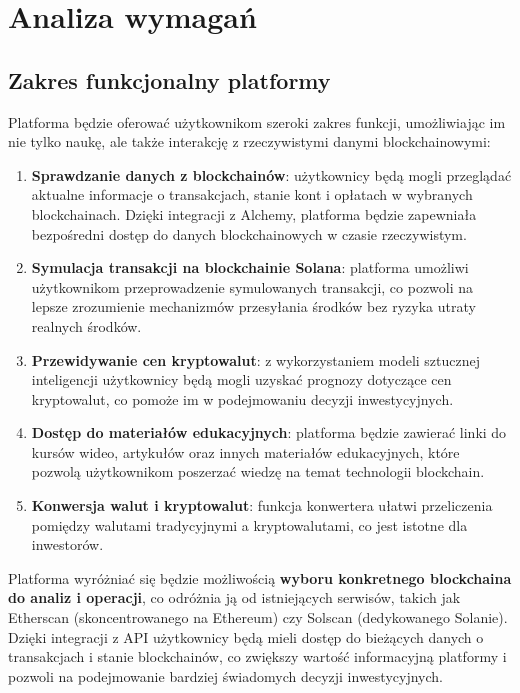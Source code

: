 \chapter{Analiza wymagań}

\section{Zakres funkcjonalny platformy}

Platforma będzie oferować użytkownikom szeroki zakres funkcji, umożliwiając im nie tylko naukę, ale także interakcję z rzeczywistymi danymi blockchainowymi:

\begin{enumerate} \item \textbf{Sprawdzanie danych z blockchainów}: użytkownicy będą mogli przeglądać aktualne informacje o transakcjach, stanie kont i opłatach w wybranych blockchainach. Dzięki integracji z Alchemy, platforma będzie zapewniała bezpośredni dostęp do danych blockchainowych w czasie rzeczywistym. \item \textbf{Symulacja transakcji na blockchainie Solana}: platforma umożliwi użytkownikom przeprowadzenie symulowanych transakcji, co pozwoli na lepsze zrozumienie mechanizmów przesyłania środków bez ryzyka utraty realnych środków. \item \textbf{Przewidywanie cen kryptowalut}: z wykorzystaniem modeli sztucznej inteligencji użytkownicy będą mogli uzyskać prognozy dotyczące cen kryptowalut, co pomoże im w podejmowaniu decyzji inwestycyjnych. \item \textbf{Dostęp do materiałów edukacyjnych}: platforma będzie zawierać linki do kursów wideo, artykułów oraz innych materiałów edukacyjnych, które pozwolą użytkownikom poszerzać wiedzę na temat technologii blockchain. \item \textbf{Konwersja walut i kryptowalut}: funkcja konwertera ułatwi przeliczenia pomiędzy walutami tradycyjnymi a kryptowalutami, co jest istotne dla inwestorów. \end{enumerate}

Platforma wyróżniać się będzie możliwością \textbf{wyboru konkretnego blockchaina do analiz i operacji}, co odróżnia ją od istniejących serwisów, takich jak Etherscan (skoncentrowanego na Ethereum) czy Solscan (dedykowanego Solanie). Dzięki integracji z API użytkownicy będą mieli dostęp do bieżących danych o transakcjach i stanie blockchainów, co zwiększy wartość informacyjną platformy i pozwoli na podejmowanie bardziej świadomych decyzji inwestycyjnych.


